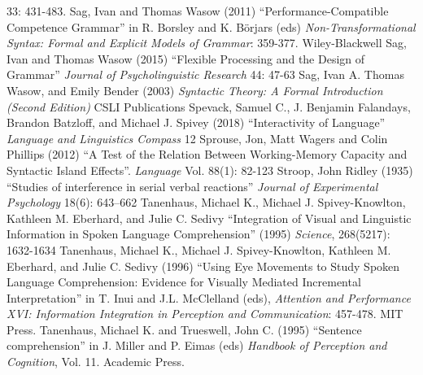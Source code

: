\documentclass[a4paper]{article}
\begin{document}
33:  
431-483.
\newline
\newline
Sag, Ivan and Thomas Wasow (2011) ``Performance-Compatible Competence Grammar'' in R. Borsley and K. Börjars (eds) {\it Non-Transformational Syntax: Formal and Explicit Models of Grammar}: 359-377. Wiley-Blackwell
\newline
\newline
Sag, Ivan and Thomas Wasow (2015) ``Flexible Processing and the Design of Grammar'' {\it Journal of Psycholinguistic Research} 44: 47-63
\newline
\newline
Sag, Ivan A. Thomas Wasow, and Emily Bender (2003) {\it Syntactic Theory: A Formal Introduction (Second Edition)} CSLI Publications
\newline
\newline
Spevack, Samuel C., 
J. Benjamin Falandays,
Brandon Batzloff, and
Michael J. Spivey (2018) ``Interactivity of Language'' {\it Language and Linguistics Compass} 12
\newline
\newline
Sprouse, Jon, Matt Wagers and Colin Phillips (2012) ``A Test of the Relation Between Working-Memory Capacity and Syntactic Island Effects''.  {\it Language}  Vol. 88(1): 82-123
\newline
\newline
Stroop, John Ridley (1935) ``Studies of interference in serial verbal reactions'' {\it Journal of Experimental Psychology} 18(6): 643–662
\newline
\newline
Tanenhaus, Michael K., Michael J. Spivey-Knowlton, Kathleen M. Eberhard, and Julie C. Sedivy
``Integration of Visual and Linguistic Information in Spoken Language Comprehension''  (1995)
{\it Science}, 268(5217): 1632-1634
\newline
\newline
Tanenhaus, Michael K., Michael J. Spivey-Knowlton, Kathleen M. Eberhard, and Julie C. Sedivy (1996)  ``Using Eye Movements to Study Spoken Language Comprehension:  Evidence for Visually Mediated Incremental Interpretation''  in T. Inui and J.L. McClelland (eds), {\it Attention and Performance XVI:  Information Integration in Perception and Communication}: 457-478. MIT Press. 
\newline
\newline
Tanenhaus, Michael K. and Trueswell, John C. (1995)  ``Sentence comprehension'' in J. Miller and P. Eimas (eds) {\it Handbook of Perception and Cognition}, Vol. 11.  Academic Press.
\end{document}
